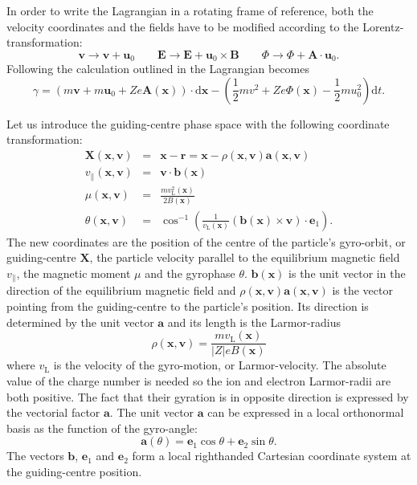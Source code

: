 \documentclass[a4paper,10pt]{article}
\newcommand{\st}[1]{\mathrm{#1}} %
\renewcommand{\vec}[1]{\mathbf{#1}}
\begin{document}
In order to write the Lagrangian in a rotating frame of reference, both the velocity coordinates and the fields have to be modified according to the Lorentz-transformation:
\begin{equation}
\vec{v} \to \vec{v} + \vec{u}_0 \qquad \vec{E} \to \vec{E} + \vec{u}_0 \times \vec{B} \qquad \Phi \to \Phi + \vec{A} \cdot \vec{u}_0.
\end{equation}
Following the calculation outlined in \cite{peeters_rotation} the Lagrangian becomes
\begin{equation}
	\gamma = \left( m \mathbf{v} + m \vec{u}_0 + Z e \mathbf{A}(\mathbf{x}) \right) \cdot \mathrm{d} \mathbf{x} - \left( \frac{1}{2} m v^2 + Z e \Phi(\mathbf{x}) - \frac{1}{2} m u_0^2 \right) \mathrm{d}t.
\end{equation}

Let us introduce the guiding-centre phase space with the following coordinate transformation:
\begin{eqnarray}
	\mathbf{X}(\mathbf{x},\mathbf{v}) &=& \mathbf{x} - \mathbf{r} = \mathbf{x} - \rho(\mathbf{x},\vec{v}) \vec{a}(\vec{x},\vec{v}) \label{eq:X}\\
	v_{\parallel}(\mathbf{x},\mathbf{v}) &=& \mathbf{v} \cdot \mathbf{b}(\mathbf{x}) \label{eq:v_par}\\
	\mu(\mathbf{x},\mathbf{v}) &=& \frac{m v_{\st{L}}^2(\mathbf{x})}{2 B(\mathbf{x})} \label{eq:mu}\\
	\theta(\mathbf{x},\mathbf{v}) &=& \cos^{-1} \left( \frac{1}{v_{\st{L}}(\mathbf{x})} (\mathbf{b}(\mathbf{x}) \times \mathbf{v}) \cdot \mathbf{e}_1 \right). \label{eq:theta}
\end{eqnarray}
The new coordinates are the position of the centre of the particle's gyro-orbit, or guiding-centre $\mathbf{X}$, the particle velocity parallel to the equilibrium magnetic field $v_{\parallel}$, the magnetic moment $\mu$ and the gyrophase $\theta$. $\mathbf{b}(\mathbf{x})$ is the unit vector in the direction of the equilibrium magnetic field and $\rho(\mathbf{x},\vec{v}) \vec{a}(\vec{x},\vec{v})$ is the vector pointing from the guiding-centre to the particle's position. Its direction is determined by the unit vector $\vec{a}$ and its length is the Larmor-radius
\begin{equation}
	\rho(\mathbf{x},\vec{v}) = \frac{m v_{\st{L}}(\mathbf{x})}{|Z| e B(\mathbf{x})}
	\label{eq:rho}
\end{equation}
where $v_{\st{L}}$ is the velocity of the gyro-motion, or Larmor-velocity. 
The absolute value of the charge number is needed so the ion and electron Larmor-radii are both positive. The fact that their gyration is in opposite direction is expressed by the vectorial factor $\vec{a}$.
The unit vector $\vec{a}$ can be expressed in a local orthonormal basis as the function of the gyro-angle:
\begin{equation}
	\mathbf{a}(\theta) = \mathbf{e}_1 \cos \theta + \mathbf{e}_2 \sin \theta.
	\label{eq:a}
\end{equation}
The vectors $\mathbf{b}$, $\mathbf{e}_1$ and $\mathbf{e}_2$ form a local righthanded Cartesian coordinate system at the guiding-centre position. 
\end{document}
